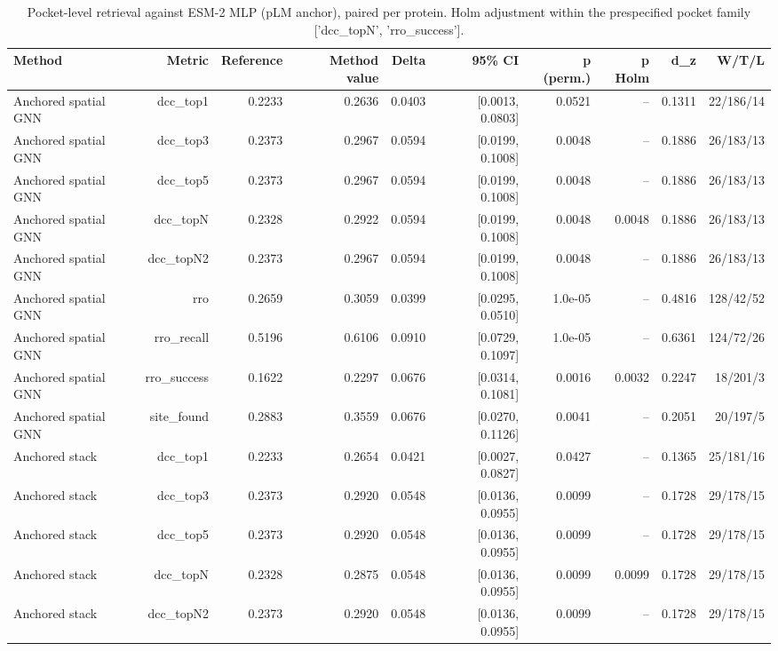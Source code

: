 \begin{table}[t]
\centering
\small
\caption{Pocket-level retrieval against ESM-2 MLP (pLM anchor), paired per protein. Holm adjustment within the prespecified pocket family ['dcc_topN', 'rro_success'].}
\label{tab:table_pocket_paired}
\begin{tabular}{lrrrrrrrrr}
\toprule
Method & Metric & Reference & Method value & Delta & 95\% CI & p (perm.) & p Holm & d\_z & W/T/L \\
\midrule
Anchored spatial GNN & dcc\_top1 & 0.2233 & 0.2636 & 0.0403 & [0.0013, 0.0803] & 0.0521 & -- & 0.1311 & 22/186/14 \\
Anchored spatial GNN & dcc\_top3 & 0.2373 & 0.2967 & 0.0594 & [0.0199, 0.1008] & 0.0048 & -- & 0.1886 & 26/183/13 \\
Anchored spatial GNN & dcc\_top5 & 0.2373 & 0.2967 & 0.0594 & [0.0199, 0.1008] & 0.0048 & -- & 0.1886 & 26/183/13 \\
Anchored spatial GNN & dcc\_topN & 0.2328 & 0.2922 & 0.0594 & [0.0199, 0.1008] & 0.0048 & 0.0048 & 0.1886 & 26/183/13 \\
Anchored spatial GNN & dcc\_topN2 & 0.2373 & 0.2967 & 0.0594 & [0.0199, 0.1008] & 0.0048 & -- & 0.1886 & 26/183/13 \\
Anchored spatial GNN & rro & 0.2659 & 0.3059 & 0.0399 & [0.0295, 0.0510] & 1.0e-05 & -- & 0.4816 & 128/42/52 \\
Anchored spatial GNN & rro\_recall & 0.5196 & 0.6106 & 0.0910 & [0.0729, 0.1097] & 1.0e-05 & -- & 0.6361 & 124/72/26 \\
Anchored spatial GNN & rro\_success & 0.1622 & 0.2297 & 0.0676 & [0.0314, 0.1081] & 0.0016 & 0.0032 & 0.2247 & 18/201/3 \\
Anchored spatial GNN & site\_found & 0.2883 & 0.3559 & 0.0676 & [0.0270, 0.1126] & 0.0041 & -- & 0.2051 & 20/197/5 \\
Anchored stack & dcc\_top1 & 0.2233 & 0.2654 & 0.0421 & [0.0027, 0.0827] & 0.0427 & -- & 0.1365 & 25/181/16 \\
Anchored stack & dcc\_top3 & 0.2373 & 0.2920 & 0.0548 & [0.0136, 0.0955] & 0.0099 & -- & 0.1728 & 29/178/15 \\
Anchored stack & dcc\_top5 & 0.2373 & 0.2920 & 0.0548 & [0.0136, 0.0955] & 0.0099 & -- & 0.1728 & 29/178/15 \\
Anchored stack & dcc\_topN & 0.2328 & 0.2875 & 0.0548 & [0.0136, 0.0955] & 0.0099 & 0.0099 & 0.1728 & 29/178/15 \\
Anchored stack & dcc\_topN2 & 0.2373 & 0.2920 & 0.0548 & [0.0136, 0.0955] & 0.0099 & -- & 0.1728 & 29/178/15 \\

\end{tabular}
\end{table}
